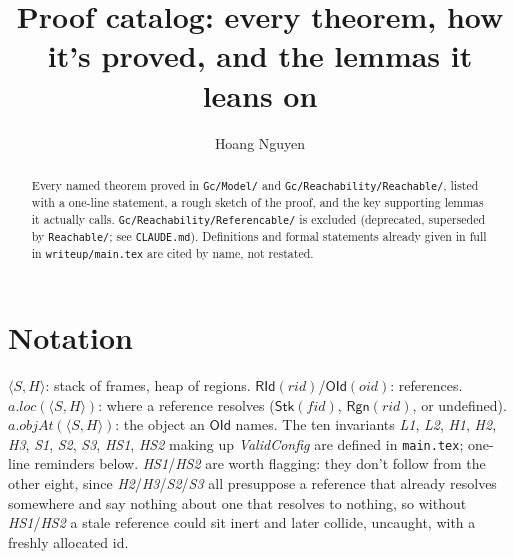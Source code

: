 \documentclass[11pt]{article}
\title{Proof catalog: every theorem, how it's proved, and the lemmas it leans on}
\author{Hoang Nguyen}
\date{}
\newcommand{\file}[1]{\texttt{#1}}
\begin{document}
\maketitle

\begin{abstract}
Every named theorem proved in \file{Gc/Model/} and \file{Gc/Reachability/Reachable/}, listed with
a one-line statement, a rough sketch of the proof, and the key supporting lemmas it actually calls.
\file{Gc/Reachability/Referencable/} is excluded (deprecated, superseded by \file{Reachable/}; see
\file{CLAUDE.md}). Definitions and formal statements already given in full in
\file{writeup/main.tex} are cited by name, not restated.
\end{abstract}

\tableofcontents

\section{Notation}

$\langle S, H\rangle$: stack of frames, heap of regions. $\mathsf{RId}(rid)$/$\mathsf{OId}(oid)$:
references. $a.loc(\langle S,H\rangle)$: where a reference resolves ($\mathsf{Stk}(fid)$,
$\mathsf{Rgn}(rid)$, or undefined). $a.objAt(\langle S,H\rangle)$: the object an $\mathsf{OId}$
names. The ten invariants \textit{L1}, \textit{L2}, \textit{H1}, \textit{H2}, \textit{H3},
\textit{S1}, \textit{S2}, \textit{S3}, \textit{HS1}, \textit{HS2} making up \textit{ValidConfig}
are defined in \file{main.tex}; one-line reminders below. \textit{HS1}/\textit{HS2} are worth
flagging: they don't follow from the other eight, since \textit{H2}/\textit{H3}/\textit{S2}/\textit{S3}
all presuppose a reference that already resolves somewhere and say nothing about one that resolves
to nothing, so without \textit{HS1}/\textit{HS2} a stale reference could sit inert and later
collide, uncaught, with a freshly allocated id.
\end{document}
